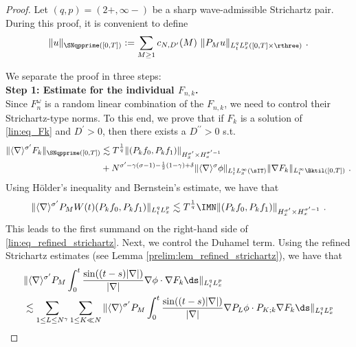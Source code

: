 \documentclass[11pt]{article}
\begin{document}
\begin{proof} Let \( (q,p) =(2+,\infty-) \) be a sharp wave-admissible Strichartz pair. During this proof, it is convenient to define
\begin{equation*}
\| u \|_{\SNqpprime([0,T])} := \sum_{M\geq 1} c_{N,D^\prime}(M) ~  \| P_M u \|_{L_t^q L_x^p([0,T]\times \rthree)}~. 
\end{equation*}

We separate the proof in three steps: \\

\textbf{Step 1: Estimate for the individual \( F_{n,k} \).}~ \\
Since \( F_n^\omega \) is a random linear combination of the \( F_{n,k} \), we need to control their Strichartz-type norms. To this end, we prove that if \( F_k \) is a solution of \eqref{lin:eq_Fk} and \( D^\prime > 0 \), then there exists a \(D^{\prime\prime}>0 \) s.t.
\begin{equation}\label{lin:eq_refined_strichartz}
\begin{aligned}
\| \langle \nabla \rangle^{\sigma^\prime} F_k \|_{\SNqpprime([0,T])}
 &\lesssim T^{\frac{1}{q}}  \| (P_k f_0,P_k f_1) \|_{H_x^{\sigma^\prime} \times H_x^{\sigma^\prime-1}} \\
 &+  N^{\sigma^\prime-\gamma(\sigma-1)-\frac{1}{2}(1-\gamma)+\delta }  \| \langle \nabla \rangle^\sigma \phi \|_{L_t^1 L_x^\infty( \sIT)} \| \nabla F_k\|_{L_t^\infty \Bktil ([0,T])}~.
\end{aligned}
\end{equation}
Using Hölder's inequality and Bernstein's estimate, we have that
\begin{equation*}
\| \langle \nabla \rangle^{\sigma^\prime} P_M W(t) ( P_k f_0, P_k f_1) \|_{L_t^q L_x^p}  
\lesssim T^{\frac{1}{q}} \IMN   \| (P_k f_0, P_k f_1) \|_{H_x^{\sigma^\prime}\times H_x^{\sigma^\prime-1}}~. 
\end{equation*}
This leads to the first summand on the right-hand side of \eqref{lin:eq_refined_strichartz}. Next, we control the Duhamel term. 
Using the refined Strichartz estimates (see Lemma \ref{prelim:lem_refined_strichartz}), we have that \\
\begin{align*}
&\| \langle \nabla \rangle^{\sigma^\prime} P_M \int_0^t \frac{\sin((t-s)|\nabla|)}{|\nabla|} \nabla \phi \cdot \nabla F_k \ds \|_{L_t^q L_x^p} \\
&\lesssim \sum_{1\leq L \leq N^\gamma} \sum_{1\leq K \ll N} \| \langle \nabla \rangle^{\sigma^\prime} P_M \int_0^t \frac{\sin((t-s)|\nabla|)}{|\nabla|} \nabla P_L \phi \cdot P_{K;k} \nabla F_k \ds \|_{L_t^q L_x^p} \\

\end{align*}
\end{proof}
\end{document}
